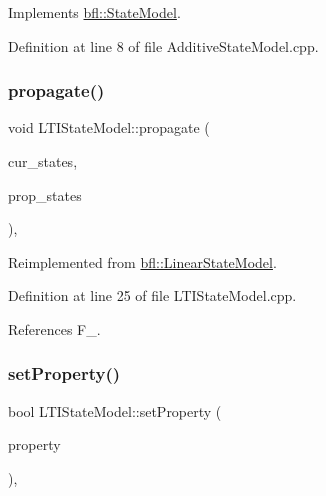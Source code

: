 Implements \mbox{\hyperlink{classbfl_1_1StateModel_a34037bc30bc07667b76b5a719a65ab82}{bfl\+::\+State\+Model}}.



Definition at line 8 of file Additive\+State\+Model.\+cpp.

\mbox{\label{classbfl_1_1LTIStateModel_a0a736ef66903c2e598f0b86892a716aa}} 
\subsubsection{\texorpdfstring{propagate()}{propagate()}}
{\footnotesize\ttfamily void L\+T\+I\+State\+Model\+::propagate (\begin{DoxyParamCaption}\item[{const Eigen\+::\+Ref$<$ const Eigen\+::\+Matrix\+Xd $>$ \&}]{cur\+\_\+states,  }\item[{Eigen\+::\+Ref$<$ Eigen\+::\+Matrix\+Xd $>$}]{prop\+\_\+states }\end{DoxyParamCaption})\hspace{0.3cm}{\ttfamily [override]}, {\ttfamily [virtual]}}



Reimplemented from \mbox{\hyperlink{classbfl_1_1LinearStateModel_a7823383ddc1ed709b9399c712997f512}{bfl\+::\+Linear\+State\+Model}}.



Definition at line 25 of file L\+T\+I\+State\+Model.\+cpp.



References F\+\_\+.

\mbox{\label{classbfl_1_1LTIStateModel_afc2264780111fe41b6a82e97bcb5e87c}} 
\subsubsection{\texorpdfstring{set\+Property()}{setProperty()}}
{\footnotesize\ttfamily bool L\+T\+I\+State\+Model\+::set\+Property (\begin{DoxyParamCaption}\item[{const std\+::string \&}]{property }\end{DoxyParamCaption})\hspace{0.3cm}{\ttfamily [override]}, {\ttfamily [virtual]}}



